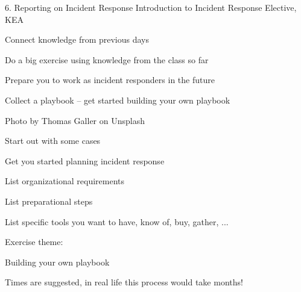 \documentclass[Screen16to9,17pt]{foils}
\begin{document}
\mytitlepage
{6. Reporting on Incident Response}
{Introduction to Incident Response Elective, KEA}




\begin{list2}
\item Connect knowledge from previous days
\item Do a big exercise using knowledge from the class so far
\item Prepare you to work as incident responders in the future
\item Collect a playbook -- get started building your own playbook
\end{list2}

{\hfill \small Photo by Thomas Galler on Unsplash}


\begin{list2}
\item Start out with some cases
\item Get you started planning incident response
\item List organizational requirements
\item List preparational steps
\item List specific tools you want to have, know of, buy, gather, ...
\end{list2}

Exercise theme:
\begin{list2}
\item Building your own playbook
\end{list2}



Times are suggested, in real life this process would take months!
\end{document}
